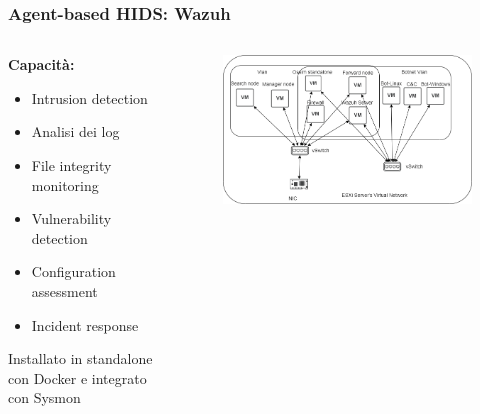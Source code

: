 \begin{frame}
    \frametitle{Agent-based HIDS: Wazuh}


    \begin{columns}[t]
        \begin{column}{0.5\textwidth}
            \textbf{Capacità:}
            \begin{itemize}
                \item Intrusion detection
                \item Analisi dei log
                \item File integrity monitoring
                \item Vulnerability detection
                \item Configuration assessment
                \item Incident response
            \end{itemize}
            \bigskip
            Installato in standalone con Docker e integrato con Sysmon

        \end{column}
        \begin{column}{0.5\textwidth}
            \begin{figure}[hbtp]
                \centering
                \includegraphics[width=\textwidth]{res/fig/infrastruttura3.png}
            \end{figure}
        \end{column}
    \end{columns}
\end{frame}



